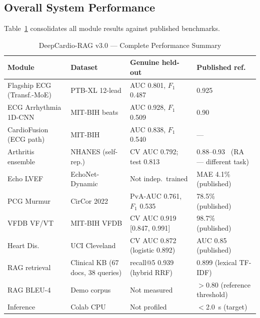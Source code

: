 \documentclass[AMA,STIX1COL,]{WileyNJD-v2}
\begin{document}
\subsection{Overall System Performance}

Table~\ref{tab:sysperf} consolidates all module results against
published benchmarks.

\begin{table}[!t]
\caption{DeepCardio-RAG v3.0 — Complete Performance Summary}
\label{tab:sysperf}
\centering
\renewcommand{\arraystretch}{1.15}
\footnotesize\setlength{\tabcolsep}{4pt}\begin{tabular}{p{1.5cm}p{1.4cm}p{1.8cm}p{1.9cm}}
\toprule
\textbf{Module} & \textbf{Dataset} & \textbf{Genuine held-out} & \textbf{Published ref.}\\
\midrule
Flagship ECG (Transf.-MoE) & PTB-XL 12-lead & AUC 0.801, $F_1$ 0.487 & 0.925~\cite{strodthoff2021}\\
ECG Arrhythmia 1D-CNN & MIT-BIH beats & AUC 0.928, $F_1$ 0.509 & 0.90~\cite{hannun2019}\\
CardioFusion (ECG path) & MIT-BIH & AUC 0.838, $F_1$ 0.540 & ---\\
Arthritis ensemble & NHANES (self-rep.) & CV AUC 0.792; test 0.813 & 0.88--0.93~\cite{tian2020} (RA --- different task)\\
Echo LVEF  & EchoNet-Dynamic  & Not indep.\ trained & MAE 4.1\%~\cite{ouyang2020} (published)\\
PCG Murmur & CirCor 2022      & PvA-AUC 0.761, $F_1$ 0.535 & 78.5\%~\cite{oliveira2022} (published)\\
VFDB VF/VT & MIT-BIH VFDB     & CV AUC 0.919 [0.847, 0.991] & 98.7\%~\cite{acharya2018} (published)\\
Heart Dis. & UCI Cleveland    & CV AUC 0.872 (logistic 0.892) & AUC 0.85~\cite{shah2020} (published)\\
RAG retrieval & Clinical KB (67 docs, 38 queries) & recall@5 0.939 (hybrid RRF) & 0.899 (lexical TF-IDF)\\
RAG BLEU-4 & Demo corpus      & Not measured & $>$0.80 (reference threshold)\\
Inference  & Colab CPU        & Not profiled & $<$2.0~s (target)\\
\bottomrule
\end{tabular}
\end{table}
\end{document}
